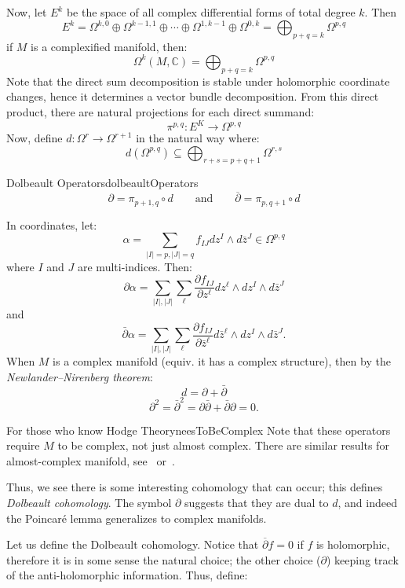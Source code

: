 \documentclass{ut-thesis}
\newcommand{\C}{{\mathbb{C}}}
\newcommand{\sse}{\subseteq}
\begin{document}
Now, let $E^k$ be the space of all complex differential forms of total degree $k$. Then
\[
  E^k = \Omega^{k,0} \oplus \Omega^{k-1, 1}\oplus \cdots \oplus \Omega^{1, k-1}\oplus \Omega^{0,k}
  = \bigoplus_{p+q=k} \Omega^{p,q}
\]
if $M$ is a complexified manifold, then:
\[
  \Omega^k(M, \C) = \bigoplus_{p+q=k} \Omega^{p,q}
\]
Note that the direct sum decomposition is stable under holomorphic coordinate changes, hence it determines
a vector bundle decomposition. From this direct product, there are natural projections for each direct summand:
\[
  \pi^{p,q}: E^K \to \Omega^{p,q}
\]
Now, define $d: \Omega^r \to \Omega^{r+1}$ in the natural way where:
\[
  d(\Omega^{p,q}) \sse \bigoplus_{r+s=p+q+1} \Omega^{r,s}
\]
\begin{defn}{Dolbeault Operators}{dolbeaultOperators}
  \[
    \partial = \pi_{p+1, q}\circ d \qquad \text{and} \qquad \overline{\partial} = \pi_{p, q+1}\circ d
  \]
\end{defn}
In coordinates, let:
\[
    \alpha = \sum_{|I|=p,|J|=q} f_{IJ} dz^I \wedge d\bar{z}^J \in \Omega^{p,q}
\]
where $I$ and $J$ are multi-indices. Then:
\[
    \partial\alpha = \sum_{|I|,|J|} \sum_\ell \frac{\partial f_{IJ}}{\partial z^\ell} dz^\ell \wedge dz^I \wedge d\bar{z}^J
\]
and
\[
    \bar{\partial}\alpha = \sum_{|I|,|J|} \sum_\ell \frac{\partial f_{IJ}}{\partial\bar{z}^\ell} d\bar{z}^\ell \wedge dz^I \wedge d\bar{z}^J.
\]
When $M$ is a complex manifold (equiv. it has a complex structure), then by the \emph{Newlander–Nirenberg
theorem}:
\[
    d = \partial + \bar{\partial}
\]
\[
    \partial^2 = \bar{\partial}^2 = \partial\bar{\partial} + \bar{\partial}\partial = 0.
\]
\begin{titledBox}{For those who know Hodge Theory}{neesToBeComplex}
  Note that these operators require $M$ to be complex, not just almost complex. There are similar results for
  almost-complex manifold, see~\cite{HodgeTheory2014} or~\cite{hodge1951kahler}.
\end{titledBox}
Thus, we see there is some interesting cohomology that can occur; this defines \emph{Dolbeault cohomology}.
The symbol $\partial$ suggests that they are dual to $d$, and indeed the Poincar\'e lemma generalizes to
complex manifolds.

Let us define the Dolbeault cohomology. Notice that $\overline{\partial}f = 0$ if $f$ is holomorphic,
therefore it is in some sense the natural choice; the other choice ($\partial$) keeping track of the
anti-holomorphic information. Thus, define:
\end{document}
